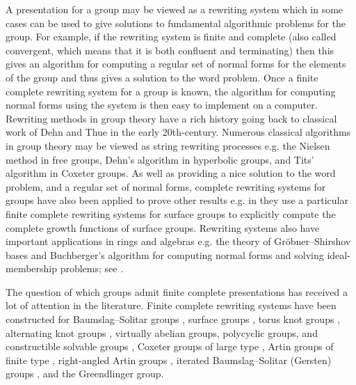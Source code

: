 \documentclass[12pt, a4paper]{amsart}
\theoremstyle{definition}
\newcounter{cases}
\begin{document}
A presentation for a group may be viewed as a rewriting system which in some cases can be used to give solutions to fundamental algorithmic problems for the group. For example, if the rewriting system is finite and complete (also called convergent, which means that it is both confluent and terminating) then this gives an algorithm for computing a regular set of normal forms for the elements of the group and thus gives a solution to the word problem. Once a finite complete rewriting system for a group is known, the algorithm for computing normal forms using the system is then easy to implement on a computer. Rewriting methods in group theory have a rich history going back to classical work of Dehn and Thue in the early 20th-century. Numerous classical algorithms in group theory may be viewed as string rewriting processes e.g. the Nielsen method in free groups, Dehn's algorithm in hyperbolic groups, and Tits' algorithm in Coxeter groups. As well as providing a nice solution to the word problem, and a regular set of normal forms, complete rewriting systems for groups have also been applied to prove other results e.g. in \cite{Grigorchu1997} they use a particular finite complete rewriting systems for surface groups to explicitly compute the complete growth functions of surface groups. Rewriting systems also have important applications in rings and algebras e.g. the theory of Gr\"{o}bner--Shirshov bases and Buchberger’s algorithm for computing normal forms and solving ideal-membership problems; see \cite{AdamsGrobner}. 

The question of which groups admit finite complete presentations has received a lot of attention in the literature. Finite complete rewriting systems have been constructed for Baumslag--Solitar groups \cite[p429]{HoltBook}, surface groups \cite{LeChenadec1986, hermiller1994rewriting, Grigorchu1997}, torus knot groups \cite{Dekov1997}, alternating knot groups \cite{Chouraqui2009}, virtually abelian groups, polycyclic groups, and constructible solvable groups \cite{Groves1993}, 
Coxeter groups of large type \cite{hermiller1994rewriting}, 
Artin groups of finite type \cite{Hermiller1999Second}, 
right-angled Artin groups  \cite{Hermiller1995}, iterated Baumslag--Solitar (Gersten) groups 
\cite{hermiller2001measuring}, and the Greendlinger group\cite{Otto1984}. 
\end{document}
